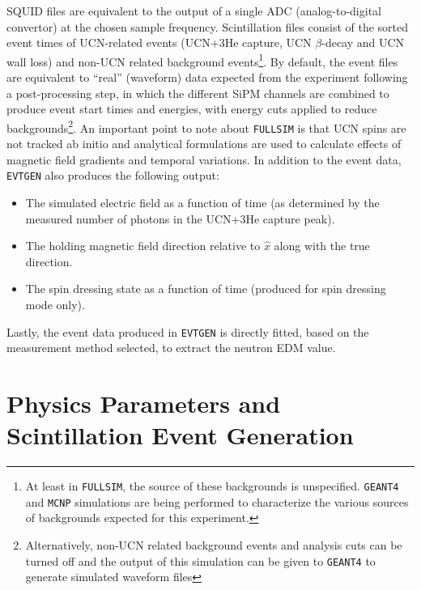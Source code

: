SQUID files are equivalent to the output of a single ADC (analog-to-digital convertor) at the chosen sample frequency. Scintillation files consist of the sorted event times of UCN-related events (UCN+3He capture, UCN $\beta$-decay and UCN wall loss) and non-UCN related background events\footnote{At least in \texttt{FULLSIM}, the source of these backgrounds is unspecified. \texttt{GEANT4} and \texttt{MCNP} simulations are being performed to characterize the various sources of backgrounds expected for this experiment.}. By default, the event files are equivalent to “real” (waveform) data expected from the experiment following a post-processing step, in which the different SiPM channels are combined to produce event start times and energies, with energy cuts applied to reduce backgrounds\footnote{Alternatively, non-UCN related background events and analysis cuts can be turned off and the output of this simulation can be given to \texttt{GEANT4} to generate simulated waveform files}. An important point to note about \texttt{FULLSIM} is that UCN spins are not tracked ab initio and analytical formulations are used to calculate effects of magnetic field gradients and temporal variations. In addition to the event data, \texttt{EVTGEN} also produces the following output:
\begin{itemize}
    \item The simulated electric field as a function of time (as determined by the measured number of photons in the UCN+3He capture peak).
    \item The holding magnetic field direction relative to $\hat{x}$ along with the true direction.
    \item The spin dressing state as a function of time (produced for spin dressing mode only).
\end{itemize}

Lastly, the event data produced in \texttt{EVTGEN} is directly fitted, based on the measurement method selected, to extract the neutron EDM value.

\section{Physics Parameters and Scintillation Event Generation}

